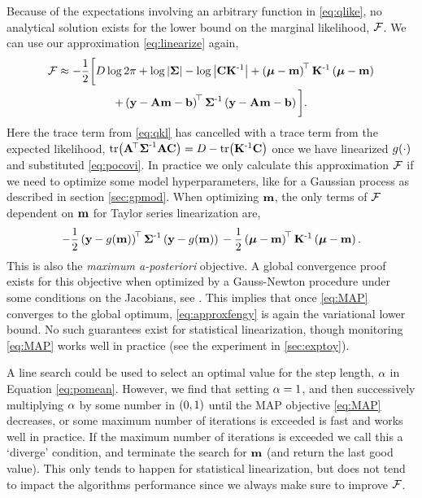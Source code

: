 \documentclass{article} %
\begin{document}
Because of the expectations involving an arbitrary function in
\eqref{eq:qlike}, no analytical solution exists for the lower bound on the
marginal likelihood, $\mathcal{F}$. We can use our approximation
\eqref{eq:linearize} again,
\begin{multline}
    \mathcal{F} \approx - \frac{1}{2} \bigg[
    D\log{2\pi} + \log\left|{\boldsymbol{\Sigma}}\right| - \log\left|{\mathbf{C}\mathbf{K}^{\text{-}1}}\right|
    + \left({\boldsymbol{\mu} - \mathbf{m}}\right)^{\!\top}\mathbf{K}^{\text{-}1}
    \left({\boldsymbol{\mu} - \mathbf{m}}\right) \\
    + \left({\mathbf{y} - \mathbf{A}\mathbf{m} - \mathbf{b}}\right)^{\!\top}\boldsymbol{\Sigma}^{\text{-}1}
        \left({\mathbf{y} - \mathbf{A}\mathbf{m} - \mathbf{b}}\right)
        \bigg].
    \label{eq:approxfengy}
\end{multline}
Here the trace term from \eqref{eq:qkl} has cancelled with a trace term from
the expected likelihood, $\text{tr}\!\left({\mathbf{A}^{\!\top}\boldsymbol{\Sigma}^{\text{-}1}\mathbf{A}\mathbf{C}}\right) = D -
\text{tr}\!\left({\mathbf{K}^{\text{-}1}\mathbf{C}}\right)$ once we have linearized $g\!\left({{\cdot}}\right)$ and
substituted \eqref{eq:pocovi}. In practice we only calculate this approximation
$\mathcal{F}$ if we need to optimize some model hyperparameters, like for a Gaussian
process as described in section \ref{sec:gpmod}. When optimizing $\mathbf{m}$, the
only terms of $\mathcal{F}$ dependent on $\mathbf{m}$ for Taylor series linearization 
are,
\begin{equation}
    -\frac{1}{2} \left({\mathbf{y} - g\!\left({{\mathbf{m}}}\right)}\right)^{\!\top}
            \boldsymbol{\Sigma}^{\text{-}1}
            \left({\mathbf{y} - g\!\left({{\mathbf{m}}}\right)}\right) \\
    -\frac{1}{2}
    \left({\boldsymbol{\mu} - \mathbf{m}}\right)^{\!\top}\mathbf{K}^{\text{-}1}\left({\boldsymbol{\mu} - \mathbf{m}}\right).
    \label{eq:MAP}
\end{equation}
This is also the \emph{maximum a-posteriori} objective. A global convergence
proof exists for this objective when optimized by a Gauss-Newton procedure
under some conditions on the Jacobians, see \cite[p255]{Nocedal2006}. This
implies that once \eqref{eq:MAP} converges to the global optimum,
\eqref{eq:approxfengy} is again the variational lower bound. No such guarantees
exist for statistical linearization, though monitoring \eqref{eq:MAP} works
well in practice (see the experiment in \autoref{sec:exptoy}). 

A line search could be used to select an optimal value for the step length,
$\alpha$ in Equation \eqref{eq:pomean}. However, we find that setting $\alpha=1$,
and then successively multiplying $\alpha$ by some number in $\left({0, 1}\right)$ until
the MAP objective \eqref{eq:MAP} decreases, or some maximum number of
iterations is exceeded is fast and works well in practice. If the maximum
number of iterations is exceeded we call this a `diverge' condition, and
terminate the search for $\mathbf{m}$ (and return the last good value). This only
tends to happen for statistical linearization, but does not tend to impact the
algorithms performance since we always make sure to improve $\mathcal{F}$.
\end{document}
